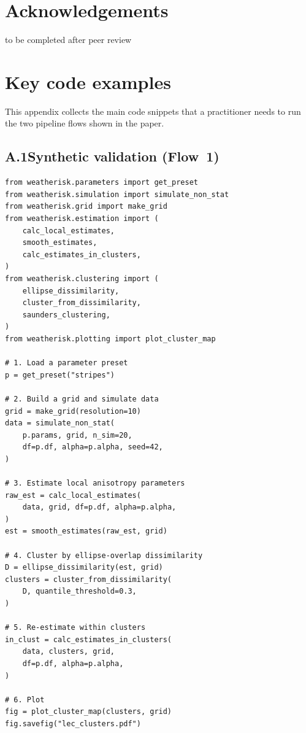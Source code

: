 \documentclass[preprint,12pt,a4paper]{elsarticle}
\begin{document}
\section*{Acknowledgements}

to be completed after peer review

\appendix

\section{Key code examples}
\label{app:code}

This appendix collects the main code snippets that a practitioner
needs to run the two pipeline flows shown in the paper.

\subsection{A.1\quad Synthetic validation (Flow~1)}

\begin{lstlisting}[caption={Complete synthetic validation
  workflow.}, label=lst:app-validate]
from weatherisk.parameters import get_preset
from weatherisk.simulation import simulate_non_stat
from weatherisk.grid import make_grid
from weatherisk.estimation import (
    calc_local_estimates,
    smooth_estimates,
    calc_estimates_in_clusters,
)
from weatherisk.clustering import (
    ellipse_dissimilarity,
    cluster_from_dissimilarity,
    saunders_clustering,
)
from weatherisk.plotting import plot_cluster_map

# 1. Load a parameter preset
p = get_preset("stripes")

# 2. Build a grid and simulate data
grid = make_grid(resolution=10)
data = simulate_non_stat(
    p.params, grid, n_sim=20,
    df=p.df, alpha=p.alpha, seed=42,
)

# 3. Estimate local anisotropy parameters
raw_est = calc_local_estimates(
    data, grid, df=p.df, alpha=p.alpha,
)
est = smooth_estimates(raw_est, grid)

# 4. Cluster by ellipse-overlap dissimilarity
D = ellipse_dissimilarity(est, grid)
clusters = cluster_from_dissimilarity(
    D, quantile_threshold=0.3,
)

# 5. Re-estimate within clusters
in_clust = calc_estimates_in_clusters(
    data, clusters, grid,
    df=p.df, alpha=p.alpha,
)

# 6. Plot
fig = plot_cluster_map(clusters, grid)
fig.savefig("lec_clusters.pdf")
\end{lstlisting}
\end{document}
